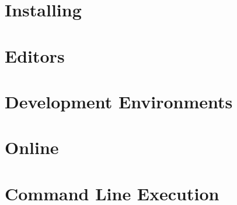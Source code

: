 

    \section{Installing \LaTeXe}
    \label{Installing}

    \section{\LaTeXe Editors}
    \label{Editors}

    \section{Development Environments}
    \label{Development Environments}

    \section{Online \LaTeXe}
    \label{Online}

    \section{Command Line Execution}
    \label{Command Line}

